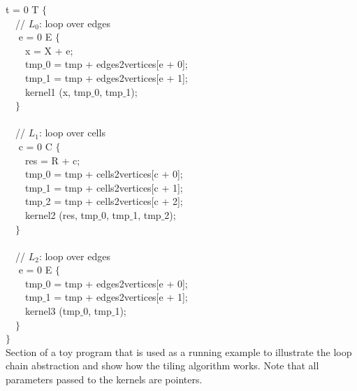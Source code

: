 \begin{algorithm}
\scriptsize\ttfamily
{}

 t = 0  T $\lbrace$\\
~~// $L_0$: loop over edges\\
~~ e = 0  E $\lbrace$\\
~~~~x = X + e;\\
~~~~tmp$\_$0 = tmp + edges2vertices[e + 0];\\
~~~~tmp$\_$1 = tmp + edges2vertices[e + 1]; \\
~~~~kernel1 (x, tmp$\_$0, tmp$\_$1);\\
~~$\rbrace$\\
~\\
~~// $L_1$: loop over cells\\
~~ c = 0  C $\lbrace$\\
~~~~res = R + c;\\
~~~~tmp$\_$0 = tmp + cells2vertices[c + 0];\\
~~~~tmp$\_$1 = tmp + cells2vertices[c + 1];\\
~~~~tmp$\_$2 = tmp + cells2vertices[c + 2];\\
~~~~kernel2 (res, tmp$\_$0, tmp$\_$1, tmp$\_$2);\\
~~$\rbrace$\\
~\\
~~// $L_2$: loop over edges\\
~~ e = 0  E $\lbrace$\\
~~~~tmp$\_$0 = tmp + edges2vertices[e + 0];\\
~~~~tmp$\_$1 = tmp + edges2vertices[e + 1]; \\
~~~~kernel3 (tmp$\_$0, tmp$\_$1);\\
~~$\rbrace$\\
$\rbrace$\\

\caption{Section of a toy program that is used as a running example to illustrate the loop chain abstraction and show how the tiling algorithm works. Note that all parameters passed to the kernels are pointers.}
\label{code:tiling-runningexample}
\end{algorithm}


